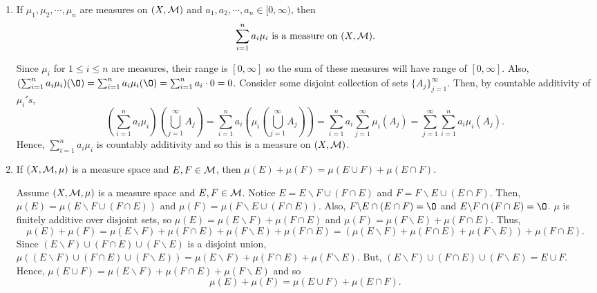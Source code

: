 \begin{enumerate}
\item If $\mu_1, \mu_2, \cdots, \mu_n$ are measures on $(X, {\mathcal M})$ and $a_1, a_2, \cdots, a_n \in [0, \infty)$, then
\begin{equation*}
\sum_{i=1}^n a_i \mu_i \text{ is a measure on } (X, {\mathcal M}).
\end{equation*}

\begin{pf}
	Since $\mu_i$ for $1 \leq i \leq n$ are measures, their range is $[0,\infty]$ so the sum of these measures will have range of $[0, \infty]$. Also, $(\sum_{i=1}^n a_i \mu_i)(\O) = \sum_{i=1}^n a_i \mu_i(\O) = \sum_{i=1}^n a_i \cdot 0=0$. Consider some disjoint collection of sets $\{A_j\}_{j=1}^\infty$. Then, by countable additivity of $\mu_i's$, 
	\[
	\left(\sum_{i=1}^n a_i \mu_i\right)\left(\bigcup_{j=1}^\infty A_j\right) = \sum_{i=1}^n a_i \left( \mu_i\left(\bigcup_{j=1}^\infty A_j\right) \right) = \sum_{i=1}^n a_i \sum_{j=1}^\infty \mu_i(A_j)=\sum_{j=1}^\infty\sum_{i=1}^n a_i \mu_i(A_j) . 
	\]
	Hence, $\sum_{i=1}^n a_i \mu_i$ is countably additivity and so this is a measure on $(X, {\mathcal M})$. 
\end{pf}

\item If $(X, {\mathcal M}, \mu)$ is a measure space and $E, F \in {\mathcal M}$, then $\mu(E)+\mu(F)=\mu(E\cup F) + \mu(E \cap F)$. 
\begin{pf}
Assume $(X, {\mathcal M}, \mu)$ is a measure space and $E, F \in {\mathcal M}$. Notice $E=E\backslash F \cup (F \cap E)$ and $F=F\backslash E \cup (E \cap F)$. Then, $\mu(E)=\mu(E\backslash F \cup (F \cap E))$ and $\mu(F)=\mu(F\backslash E \cup (F \cap E))$. Also, $F\backslash E \cap (E \cap F)=\O$ and $E\backslash F \cap (F \cap E)=\O$. $\mu$ is finitely additive over disjoint sets, so $\mu(E)=\mu(E\backslash F)+ \mu(F \cap E)$ and $\mu(F)=\mu(F\backslash E)+ \mu(F \cap E)$. Thus,
\[
\mu(E) + \mu(F) = \mu(E\backslash F)+ \mu(F \cap E)+\mu(F\backslash E)+ \mu(F \cap E)=(\mu(E\backslash F)+ \mu(F \cap E)+\mu(F\backslash E)) +\mu(F \cap E). 
\]
Since $(E\backslash F) \cup (F\cap E) \cup (F \backslash E)$ is a disjoint union, $\mu((E\backslash F) \cup (F\cap E) \cup (F \backslash E))= \mu(E\backslash F) + \mu (F\cap E) +\mu(F \backslash E)$. But, $(E\backslash F) \cup (F\cap E) \cup (F \backslash E)=E \cup F$. Hence, $\mu(E \cup F) = \mu(E\backslash F) + \mu (F\cap E) +\mu(F \backslash E)$ and so 
\[
\mu(E) + \mu(F) = \mu(E \cup F) + \mu(E \cap F). 
\]

\end{pf}


\end{enumerate}
